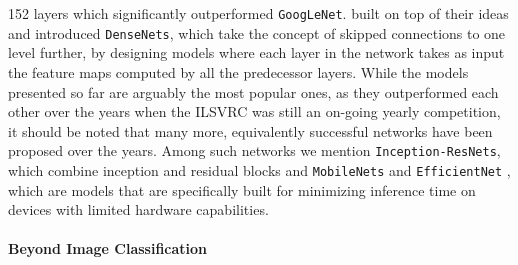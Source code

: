 152 layers which significantly outperformed \texttt{GoogLeNet}. \citet{huang2017densely} built on top of their ideas and introduced \texttt{DenseNets}, which take the concept of skipped connections to one level further, by designing models where each layer in the network takes as input the feature maps computed by all the predecessor layers. While the models presented so far are arguably the most popular ones, as they outperformed each other over the years when the ILSVRC was still an on-going yearly competition, it should be noted that many more, equivalently successful networks have been proposed over the years. Among such networks we mention \texttt{Inception-ResNets}, which combine inception and residual blocks \cite{szegedy2017inception} and \texttt{MobileNets} \cite{sandler2018mobilenetv2, howard2019searching} and \texttt{EfficientNet} \cite{tan2019efficientnet,}, which are models that are specifically built for minimizing inference time on devices with limited hardware capabilities. 

\paragraph{Beyond Image Classification}


